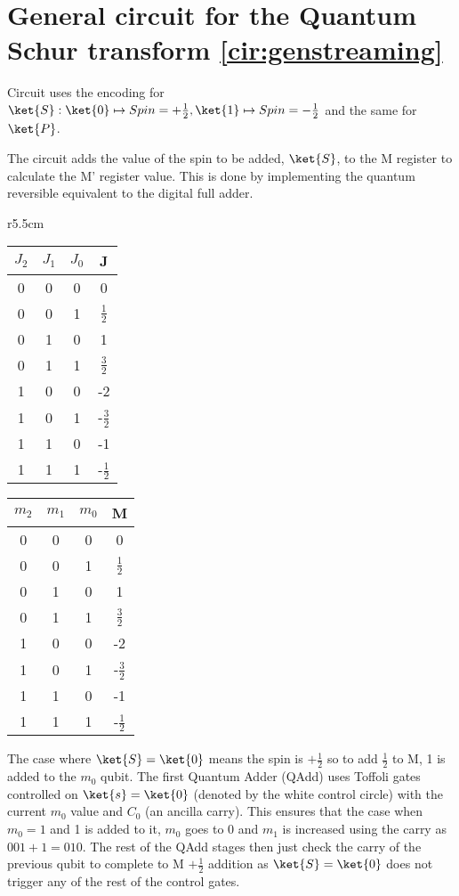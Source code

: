 \section{General circuit for the Quantum Schur transform \autoref{cir:genstreaming}}

Circuit uses the encoding for $\ket{S} : \ket{0} \mapsto Spin = +\frac{1}{2}, \ket{1} \mapsto Spin = -\frac{1}{2}$ and the same for $\ket{P}$. 

The circuit adds the value of the spin to be added, $\ket{S}$, to the M register to calculate the M' register value. This is done by implementing the quantum reversible equivalent to the digital full adder. 

\begin{wraptable}{r}{5.5cm}
\begin{tabular}{ |c c c|c| }
\hline
 $J_2$ &$J_1$ &$J_0$ &J \\
 \hline
 0 &0 &0 &0 \\ 
 0 &0 &1 &$\frac{1}{2}$ \\ 
 0 &1 &0 &1 \\ 
 0 &1 &1 &$\frac{3}{2}$ \\ 
 \hline 
 1 &0 &0 &-2 \\ 
 1 &0 &1 &-$\frac{3}{2}$ \\ 
 1 &1 &0 &-1 \\ 
 1 &1 &1 &-$\frac{1}{2}$ \\  
 \hline 
\end{tabular}
\quad
\begin{tabular}{ |c c c|c| } 
\hline
 $m_2$ &$m_1$ &$m_0$ &M \\
 \hline
 0 &0 &0 &0 \\ 
 0 &0 &1 &$\frac{1}{2}$ \\ 
 0 &1 &0 &1 \\ 
 0 &1 &1 &$\frac{3}{2}$ \\ 
 \hline 
 1 &0 &0 &-2 \\ 
 1 &0 &1 &-$\frac{3}{2}$ \\ 
 1 &1 &0 &-1 \\ 
 1 &1 &1 &-$\frac{1}{2}$ \\  
 \hline
\end{tabular}
\caption{Tables giving binary Two's complement encoding to spin values of the M and J registers}
\label{tab:encoding}
\end{wraptable}

The case where $\ket{S} = \ket{0}$ means the spin is $+\frac{1}{2}$ so to add $\frac{1}{2}$ to M, 1 is added to the $m_0$ qubit. The first Quantum Adder (QAdd) uses Toffoli gates controlled on $\ket{s}=\ket{0}$ (denoted by the white control circle) with the current $m_0$ value and $C_0$ (an ancilla carry). This ensures that the case when $m_0 = 1$ and 1 is added to it, $m_0$ goes to 0 and $m_1$ is increased using the carry as $001+1=010$. The rest of the QAdd stages then just check the carry of the previous qubit to complete to M $+ \frac{1}{2}$ addition as $\ket{S} = \ket{0}$ does not trigger any of the rest of the control gates.

